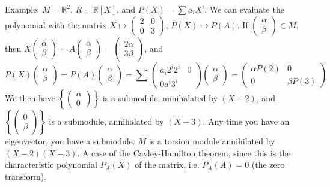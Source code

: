 \documentclass{article}
\theoremstyle{plain}
\theoremstyle{remark}
\newcommand{\R}{{\mathbb R}}
\begin{document}
Example: $M = \R^2$, $R = \R[X]$, and $P(X) = \sum a_i X^i$.
We can evaluate the polynomial with the matrix
$X \mapsto \begin{pmatrix} 2 & 0 \\ 0 & 3 \end{pmatrix}$,
$P(X) \mapsto P(A)$.
If $\begin{pmatrix} \alpha \\ \beta \end{pmatrix} \in M$,
then $X\begin{pmatrix} \alpha \\ \beta \end{pmatrix}
= A\begin{pmatrix} \alpha \\ \beta \end{pmatrix}
= \begin{pmatrix} 2\alpha \\ 3\beta \end{pmatrix}$,
and
\[
	P(X)\begin{pmatrix} \alpha \\ \beta \end{pmatrix}
	= P(A) \begin{pmatrix} \alpha \\ \beta \end{pmatrix}
	= \sum \begin{pmatrix} a_i2^i 2^i & 0 \\ 0 a^i3^i\end{pmatrix}
	\begin{pmatrix} \alpha \\ \beta \end{pmatrix}
	= \begin{pmatrix} \alpha P(2) & 0 \\ 0 & \beta P(3) \end{pmatrix}
\]
We then have $\left\{\begin{pmatrix} \alpha \\ 0 \end{pmatrix}\right\}$ is a submodule,
annihalated by $(X-2)$, and 
$\left\{\begin{pmatrix} 0 \\ \beta \end{pmatrix}\right\}$ is a submodule, annihalated by $(X-3)$.
Any time you have an eigenvector, you have a submodule.
$M$ is a torsion module annihilated by $(X-2)(X-3)$.
A case of the Cayley-Hamilton theorem, since this is the characteristic polynomial
$P_A(X)$ of the matrix, i.e. $P_A(A) = 0$ (the zero transform).
\end{document}

